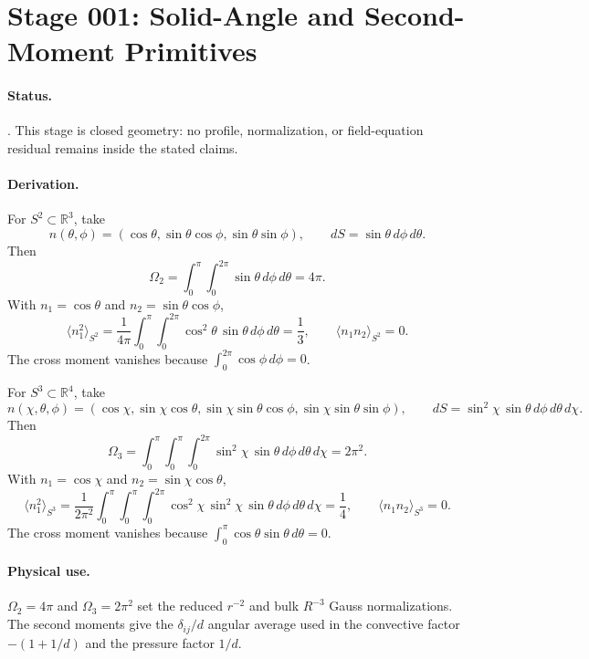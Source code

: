 \section{Stage 001: Solid-Angle and Second-Moment Primitives}

\claimstatus{\StatusExact}

\paragraph{Status.}
\StatusExact. This stage is closed geometry: no profile, normalization, or
field-equation residual remains inside the stated claims.

\paragraph{Derivation.}
For \(S^2 \subset \mathbb{R}^3\), take
\[
  n(\theta,\phi) =
  (\cos\theta,\sin\theta\cos\phi,\sin\theta\sin\phi),
  \qquad
  dS=\sin\theta\,d\phi\,d\theta .
\]
Then 
\[
  \Omega_2
  =
  \int_0^\pi\int_0^{2\pi}\sin\theta\,d\phi\,d\theta
  =4\pi .
\]
With \(n_1=\cos\theta\) and \(n_2=\sin\theta\cos\phi\),
\[
  \langle n_1^2\rangle_{S^2}
  =
  \frac{1}{4\pi}\int_0^\pi\int_0^{2\pi}
  \cos^2\theta\,\sin\theta\,d\phi\,d\theta
  =\frac{1}{3},
  \qquad
  \langle n_1n_2\rangle_{S^2}=0 .
\]
The cross moment vanishes because
\(\int_0^{2\pi}\cos\phi\,d\phi=0\).

For \(S^3 \subset \mathbb{R}^4\), take
\[
  n(\chi,\theta,\phi)=
  (\cos\chi,\sin\chi\cos\theta,\sin\chi\sin\theta\cos\phi,
  \sin\chi\sin\theta\sin\phi),
  \qquad
  dS=\sin^2\chi\,\sin\theta\,d\phi\,d\theta\,d\chi .
\]
Then 
\[
  \Omega_3
  =
  \int_0^\pi\int_0^\pi\int_0^{2\pi}
  \sin^2\chi\,\sin\theta\,d\phi\,d\theta\,d\chi
  =2\pi^2 .
\]
With \(n_1=\cos\chi\) and \(n_2=\sin\chi\cos\theta\),
\[
  \langle n_1^2\rangle_{S^3}
  =
  \frac{1}{2\pi^2}\int_0^\pi\int_0^\pi\int_0^{2\pi}
  \cos^2\chi\,\sin^2\chi\,\sin\theta\,
  d\phi\,d\theta\,d\chi
  =\frac{1}{4},
  \qquad
  \langle n_1n_2\rangle_{S^3}=0 .
\]
The cross moment vanishes because
\(\int_0^\pi\cos\theta\sin\theta\,d\theta=0\).

\paragraph{Physical use.}
\(\Omega_2=4\pi\) and \(\Omega_3=2\pi^2\) set the reduced \(r^{-2}\)
and bulk \(R^{-3}\) Gauss normalizations. The second moments give the
\(\delta_{ij}/d\) angular average used in the convective factor
\(-(1+1/d)\) and the pressure factor \(1/d\).
